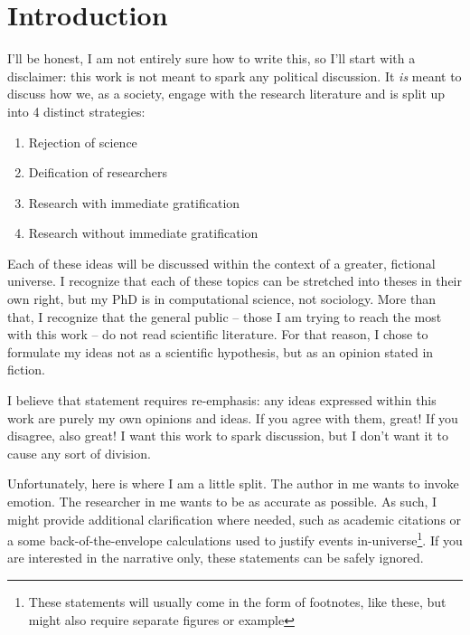 \chapter{Introduction}

I'll be honest, I am not entirely sure how to write this, so I'll start with a disclaimer: this work is not meant to spark any political discussion.
It \textit{is} meant to discuss how we, as a society, engage with the research literature and is split up into 4 distinct strategies:

\begin{enumerate}
\item Rejection of science
\item Deification of researchers
\item Research with immediate gratification
\item Research without immediate gratification
\end{enumerate}

Each of these ideas will be discussed within the context of a greater, fictional universe.
I recognize that each of these topics can be stretched into theses in their own right, but my PhD is in computational science, not sociology.
More than that, I recognize that the general public -- those I am trying to reach the most with this work -- do not read scientific literature.
For that reason, I chose to formulate my ideas not as a scientific hypothesis, but as an opinion stated in fiction.

I believe that statement requires re-emphasis: any ideas expressed within this work are purely my own opinions and ideas.
If you agree with them, great!
If you disagree, also great!
I want this work to spark discussion, but I don't want it to cause any sort of division.

Unfortunately, here is where I am a little split.
The author in me wants to invoke emotion.
The researcher in me wants to be as accurate as possible.
As such, I might provide additional clarification where needed, such as academic citations or a some back-of-the-envelope calculations used to justify events in-universe\footnote{These statements will usually come in the form of footnotes, like these, but might also require separate figures or example}.
If you are interested in the narrative only, these statements can be safely ignored.

